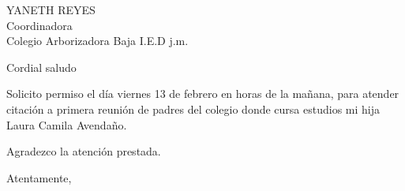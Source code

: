 \documentclass[letterpaper,spanish,11pt]{letter}
\begin{document}
\begin{letter}{YANETH REYES\\Coordinadora\\Colegio Arborizadora Baja I.E.D j.m.}
	
\opening{Cordial saludo}
Solicito permiso el día viernes 13 de febrero en horas de la mañana, para atender citación a primera reunión de padres del colegio donde cursa estudios mi hija Laura Camila Avendaño.

Agradezco la atención prestada.
\closing{Atentamente,}


\end{letter}
\end{document}
